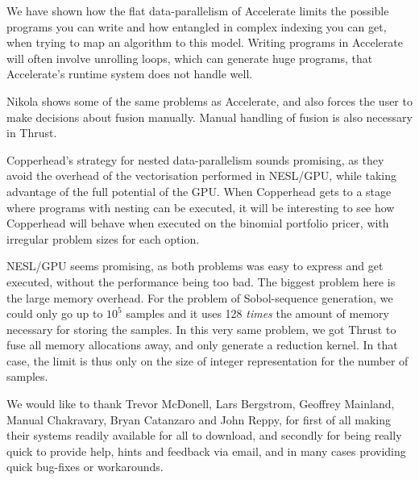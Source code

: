 \documentclass[preprint]{sigplanconf}
\begin{document}
We have shown how the flat data-parallelism of Accelerate limits the
possible programs you can write and how entangled in complex indexing
you can get, when trying to map an algorithm to this model. Writing
programs in Accelerate will often involve unrolling loops, which can
generate huge programs, that Accelerate's runtime system does not
handle well.

Nikola shows some of the same problems as Accelerate, and also forces
the user to make decisions about fusion manually. Manual handling of
fusion is also necessary in Thrust.

Copperhead's strategy for nested data-parallelism sounds promising, as
they avoid the overhead of the vectorisation performed in NESL/GPU,
while taking advantage of the full potential of the GPU. When
Copperhead gets to a stage where programs with nesting can be
executed, it will be interesting to see how Copperhead will behave
when executed on the binomial portfolio pricer, with irregular problem
sizes for each option.

NESL/GPU seems promising, as both problems was easy to express and get
executed, without the performance being too bad. The biggest problem
here is the large memory overhead. For the problem of
Sobol-sequence generation, we could only go up to $10^5$ samples and
it uses 128 \emph{times} the amount of memory necessary for storing
the samples. In this very same problem, we got Thrust to fuse all
memory allocations away, and only generate a reduction kernel. In that
case, the limit is thus only on the size of integer representation for
the number of samples.

\acks 

We would like to thank Trevor McDonell, Lars Bergstrom, Geoffrey
Mainland, Manual Chakravary, Bryan Catanzaro and John Reppy, for first
of all making their systems readily available for all to download, and
secondly for being really quick to provide help, hints and feedback
via email, and in many cases providing quick bug-fixes or workarounds.





\end{document}
